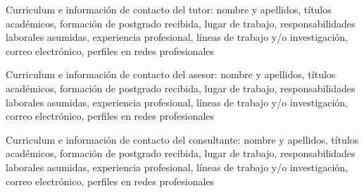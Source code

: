 \contactdata

\parskip 10pt  \setlength{\parindent}{0pc}

Curriculum e información de contacto del tutor: nombre y apellidos, títulos académicos, formación de postgrado recibida, lugar de trabajo, responsabilidades laborales asumidas, experiencia profesional, líneas de trabajo y/o investigación, correo electrónico, perfiles en redes profesionales

Curriculum e información de contacto del asesor: nombre y apellidos, títulos académicos, formación de postgrado recibida, lugar de trabajo, responsabilidades laborales asumidas, experiencia profesional, líneas de trabajo y/o investigación, correo electrónico, perfiles en redes profesionales

Curriculum e información de contacto del consultante: nombre y apellidos, títulos académicos, formación de postgrado recibida, lugar de trabajo, responsabilidades laborales asumidas, experiencia profesional, líneas de trabajo y/o investigación, correo electrónico, perfiles en redes profesionales